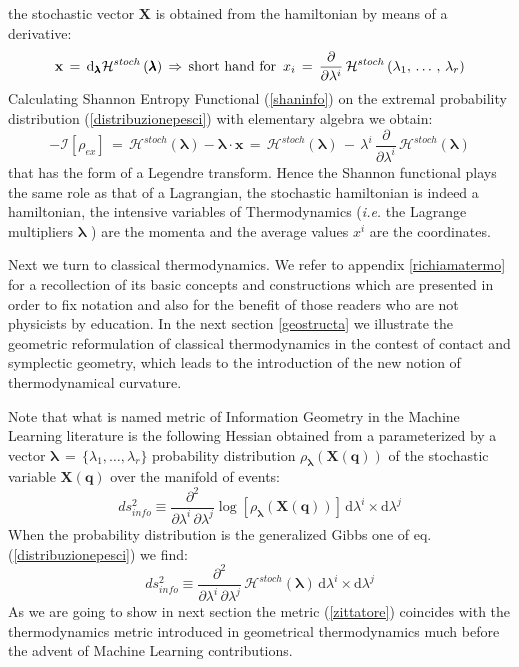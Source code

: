 \documentclass[10pt,a4paper]{article}
\begin{document}
the stochastic vector $\mathbf{X}$  is obtained from the  hamiltonian
by means of a derivative:
\begin{equation}\label{variabiliestensive}
    \mathbf{x}\,= \, \mathrm{d}_{\pmb{\lambda}}\mathcal{H}^{stoch}\left(\pmb{\lambda}
    \right) \,
    \Rightarrow\,
    \text{short hand for }\null \, x_i \, = \, \frac{\partial}{\partial
    \lambda^i} \,\mathcal{H}^{stoch}\left(\lambda_1,\,\dots \, , \, \lambda_r\right)
\end{equation}
Calculating Shannon Entropy Functional (\ref{shaninfo}) on the extremal
probability distribution
(\ref{distribuzionepesci}) with elementary algebra we obtain:
\begin{equation}
   - \mathcal{I}\left[\rho_{ex}\right]\, = \,
    \mathcal{H}^{stoch}\left(\pmb{\lambda}\right) - \pmb{\lambda}\cdot
    \mathbf{x} \, = \, \mathcal{H}^{stoch}\left(\pmb{\lambda}\right)\, -\,
    \lambda^i \, \frac{\partial}{\partial
    \lambda^i} \,\mathcal{H}^{stoch}\left(\pmb{\lambda}\right)
\label{leggendoleggo}
\end{equation}
that  has the  form of a  Legendre transform. Hence the Shannon functional plays the same role as that of a Lagrangian,  the stochastic hamiltonian is indeed a hamiltonian, the intensive variables of Thermodynamics (\textit{i.e.} the Lagrange multipliers $\pmb{\lambda}$ ) are
the momenta and the average values $x^i$ are the coordinates.
\par
Next we turn to classical thermodynamics. We refer to appendix
\ref{richiamatermo} for a recollection of its basic concepts and constructions which are presented in order to fix notation and also for the benefit of those readers who are not physicists by education. In the next section \ref{geostructa}
we illustrate the geometric reformulation of classical thermodynamics in the contest of contact and symplectic geometry, which leads to the introduction of the new notion of thermodynamical curvature.
\par
Note that what is named metric of Information Geometry in the Machine Learning literature is the following Hessian obtained from a parameterized by a vector $\pmb{\lambda} \, =\,\{\lambda_1,\dots, \lambda_r\}$  probability distribution $\rho_{\pmb{\lambda}}(\mathbf{X}(\mathbf{q}))$ of the stochastic variable $\mathbf{X}(\mathbf{q})$ over the manifold of events:
\begin{equation}
\label{parlatore}
ds^{2}_{info} \equiv \frac{\partial^2}{\partial \lambda^i \, \partial \lambda^j} \log \left[\rho_{\pmb{\lambda}}(\mathbf{X}(\mathbf{q}))\right] \, \mathrm{d}\lambda^i \times \mathrm{d}\lambda^j
\end{equation}
When the probability distribution is the generalized Gibbs one of eq.(\ref{distribuzionepesci}) we find:
\begin{equation}
\label{zittatore}
ds^{2}_{info} \equiv \frac{\partial^2}{\partial \lambda^i \, \partial \lambda^j}\, \boldsymbol{\mathcal{H}}^{stoch}(\pmb{\lambda} ) \, \mathrm{d}\lambda^i \times \mathrm{d}\lambda^j
\end{equation}
As we are going to show in next section the metric (\ref{zittatore}) coincides with the thermodynamics metric introduced in geometrical thermodynamics much before the advent of Machine Learning contributions.
\end{document}
